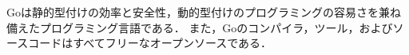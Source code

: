 Go\cite{golang}は静的型付けの効率と安全性，動的型付けのプログラミングの容易さを兼ね備えたプログラミング言語である．
また，Goのコンパイラ，ツール，およびソースコードはすべてフリーなオープンソースである．

